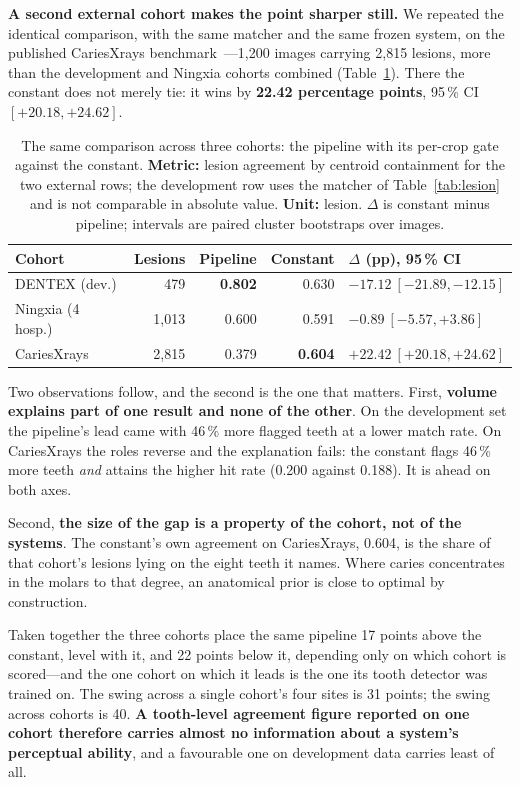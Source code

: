 \documentclass[conference]{IEEEtran}
\begin{document}
\textbf{A second external cohort makes the point sharper still.} We repeated the
identical comparison, with the same matcher and the same frozen system, on the
published CariesXrays benchmark~\cite{chen2024cariesxrays}---1{,}200 images
carrying 2{,}815 lesions, more than the development and Ningxia
cohorts combined (Table~\ref{tab:cohorts}). There the constant does not merely
tie: it wins by \textbf{22.42 percentage points}, 95\,\% CI $[+20.18, +24.62]$.

\begin{table}[t]
\caption{The same comparison across three cohorts: the pipeline with its per-crop
gate against the constant. \textbf{Metric:} lesion agreement by centroid
containment for the two external rows; the development row uses the matcher of
Table~\ref{tab:lesion} and is not comparable in absolute value. \textbf{Unit:}
lesion. $\Delta$ is constant minus pipeline; intervals are paired cluster
bootstraps over images.}
\label{tab:cohorts}
\centering
\footnotesize
\setlength{\tabcolsep}{3pt}
\begin{tabular}{lrrrl}
\toprule
Cohort & Lesions & Pipeline & Constant & $\Delta$ (pp), 95\,\% CI \\
\midrule
DENTEX (dev.) & 479   & \textbf{0.802} & 0.630 & $-17.12\ [-21.89, -12.15]$ \\
Ningxia (4 hosp.) & 1{,}013 & 0.600 & 0.591 & $-0.89\ [-5.57, +3.86]$ \\
CariesXrays & 2{,}815 & 0.379 & \textbf{0.604} & $\mathbf{+22.42\ [+20.18, +24.62]}$ \\
\bottomrule
\end{tabular}
\end{table}

Two observations follow, and the second is the one that matters. First,
\textbf{volume explains part of one result and none of the other}. On the
development set the pipeline's lead came with 46\,\% more flagged teeth at a
lower match rate. On CariesXrays the roles reverse and the explanation fails: the
constant flags 46\,\% more teeth \emph{and} attains the higher hit rate (0.200
against 0.188). It is ahead on both axes.

Second, \textbf{the size of the gap is a property of the cohort, not of the
systems}. The constant's own agreement on CariesXrays, 0.604, is the share of
that cohort's lesions lying on the eight teeth it names. Where caries
concentrates in the molars to that degree, an anatomical prior is close to
optimal by construction.

Taken together the three cohorts place the same pipeline 17 points above the
constant, level with it, and 22 points below it, depending only on which
cohort is scored---and the one cohort on which it leads is the one its tooth
detector was trained on. The swing across a single cohort's four sites is 31
points; the swing across cohorts is 40. \textbf{A tooth-level agreement figure
reported on one cohort therefore carries almost no information about a system's
perceptual ability}, and a favourable one on development data carries least of
all.
\end{document}
